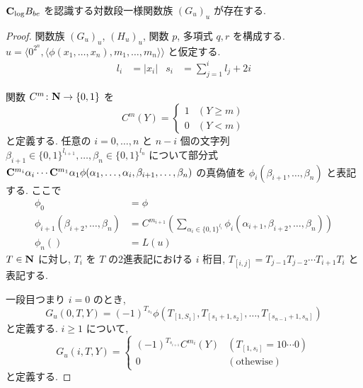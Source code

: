 \begin{lemma}
 $\mathbf{C}_{\log} B_{be}$ を認識する対数段一様関数族 $(G_u)_u$ が存在する.
\end{lemma}

\begin{proof}
 関数族 $(G_u)_u$, $(H_u)_u$, 関数 $p$, 多項式 $q,r$ を構成する.
 $u  = \langle 0^{2^n}, 
 \langle \phi(x_1, \dots, x_n), m_1, \dots, m_n \rangle \rangle$
 と仮定する.
 \begin{align}
  l_i &= |x_i| &
  s_i &= \sum^i_{j=1}l_j + 2i
 \end{align}
 
 関数 $C^m \colon \mathbf N \to \{0,1\}$ を
 \begin{equation}
  C^m(Y) 
     = \begin{cases}
       1 & (Y \ge m) \\
       0 & (Y < m) \end{cases}
 \end{equation}
 と定義する. 
 任意の $i = 0, \dots, n$ と $n-i$ 個の文字列 
 $\beta_{i+1} \in \{0,1\}^{l_{i+1}}, \dots, \beta_n \in \{0,1\}^{l_n}$ 
 について部分式
 $\mathbf{C}^{m_{i}}{\alpha_i} \cdots \mathbf{C}^{m_1}{\alpha_1}
 \phi(\alpha_1, \dots, \alpha_i, \beta_{i+1}, \dots, \beta_n)$
 の真偽値を $\phi_i(\beta_{i+1}, \dots, \beta_n)$ と表記する.
 ここで
 \begin{align}
  \phi_0 &= \phi 
  \\ \label{eq:phi-step}
  \phi_{i+1}(\beta_{i+2}, \dots, \beta_n) 
  &= C^{m_{i+1}}\left(\sum\nolimits_{\alpha_i \in \{0,1\}^{l_i}} 
  \phi_i(\alpha_{i+1}, \beta_{i+2}, \dots, \beta_{n})\right) 
  \\
  \phi_n() &= L(u) 
 \end{align}
 $T \in \mathbf N$ に対し, $T_i$ を $T$ の2進表記における $i$ 桁目, 
 $T_{[i,j]} = T_{j-1} T_{j-2} \cdots T_{i+1} T_{i}$ と表記する.


 一段目つまり $i=0$ のとき,
 \begin{equation}
  G_u(0,T,Y) = 
   (-1)^{T_{s_1}}\phi(T_{[1,S_1]}, T_{[s_1+1,s_2]},
    \dots, T_{[s_{n-1}+1,s_n]}) 
 \end{equation}
 と定義する.
 $i \ge 1$ について, 
 \begin{equation} \label{eq:def-Gu:case0}
  G_u(i,T,Y) = 
   \begin{cases}
    (-1)^{T_{s_{i+1}}} C^{m_i}(Y) 
    & (T_{[1,s_i]} = 10 \cdots 0) \\
    0 & (\text{othewise})
   \end{cases} 
 \end{equation}
 と定義する.



\end{proof}
